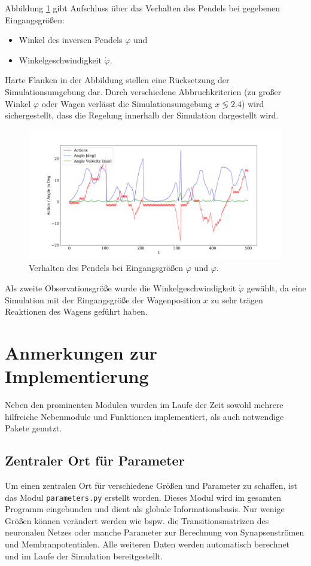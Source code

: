 	Abbildung \ref{fig:plot_action} gibt Aufschluss über das Verhalten des Pendels bei gegebenen Eingangsgrößen:
	\begin{itemize}
		\item Winkel des inversen Pendels $\varphi$ und
		\item Winkelgeschwindigkeit $\dot{\varphi}$.
	\end{itemize}
	Harte Flanken in der Abbildung stellen eine Rücksetzung der Simulationsumgebung dar. Durch verschiedene Abbruchkriterien (zu großer Winkel $\varphi$ oder Wagen verlässt die Simulationsumgebung $x\lessgtr2.4$) wird sichergestellt, dass die Regelung innerhalb der Simulation dargestellt wird.
	\begin{figure}[H]
		\centering
		\includegraphics[width=15cm]{figures/chap_implement/plot_action.pdf}
		\caption{Verhalten des Pendels bei Eingangsgrößen $\varphi$ und $\dot{\varphi}$.}
		\label{fig:plot_action}
	\end{figure}
	Als zweite Observationsgröße wurde die Winkelgeschwindigkeit $\dot{\varphi}$ gewählt, da eine Simulation mit der Eingangsgröße der Wagenposition $x$ zu sehr trägen Reaktionen des Wagens geführt haben.

\section{Anmerkungen zur Implementierung}
\label{sec:imp_sonst}
	Neben den prominenten Modulen wurden im Laufe der Zeit sowohl mehrere hilfreiche Nebenmodule und Funktionen implementiert, als auch notwendige Pakete genutzt.
	\subsection{Zentraler Ort für Parameter}
		Um einen zentralen Ort für verschiedene Größen und Parameter zu schaffen, ist das Modul \texttt{parameters.py} erstellt worden. Dieses Modul wird im gesamten Programm eingebunden und dient als globale Informationsbasis. Nur wenige Größen können verändert werden wie bspw. die Transitionsmatrizen des neuronalen Netzes oder manche Parameter zur Berechnung von Synapsenströmen und Membranpotentialen. Alle weiteren Daten werden automatisch berechnet und im Laufe der Simulation bereitgestellt.
